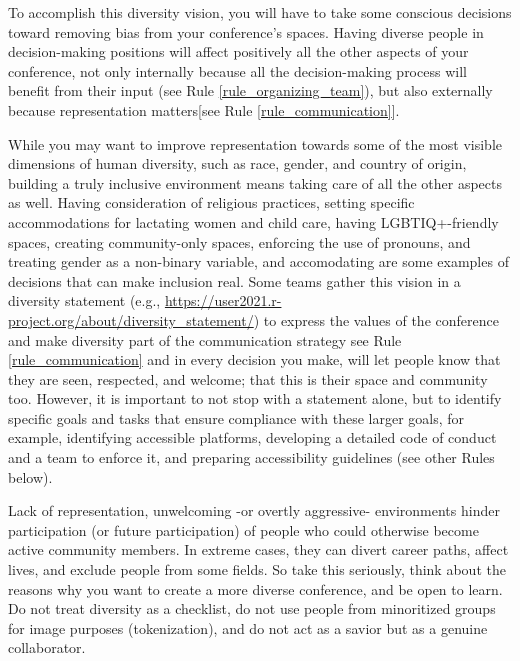 \documentclass[10pt,letterpaper]{article}
\begin{document}
To accomplish this diversity vision, you will have to take some conscious decisions toward removing bias from your conference's spaces. Having diverse people in decision-making positions will affect positively all the other aspects of your conference, not only internally because all the decision-making process will benefit from their input (see Rule \ref{rule_organizing_team}), but also externally because representation matters[see Rule \ref{rule_communication}].

While you may want to improve representation towards some of the most visible dimensions of human diversity, such as race, gender, and country of origin, building a truly inclusive environment means taking care of all the other aspects as well. Having consideration of religious practices, setting specific accommodations for lactating women and child care, having LGBTIQ+-friendly spaces, creating community-only spaces, enforcing the use of pronouns, and treating gender as a non-binary variable, and accomodating are some examples of decisions that can make inclusion real. 
Some teams gather this vision in a diversity statement (e.g., \url{https://user2021.r-project.org/about/diversity_statement/}) to express the values of the conference and make diversity part of the communication strategy see Rule \ref{rule_communication} and in every decision you make, will let people know that they are seen, respected, and welcome; that this is their space and community too. 
However, it is important to not stop with a statement alone, but to identify specific goals and tasks that ensure compliance with these larger goals, for example, identifying accessible platforms, developing a detailed code of conduct and a team to enforce it, and preparing accessibility guidelines (see other Rules below).

Lack of representation, unwelcoming -or overtly aggressive- environments hinder participation (or future participation) of people who could otherwise become active community members. In extreme cases, they can divert career paths, affect lives, and exclude people from some fields. So take this seriously, think about the reasons why you want to create a more diverse conference, and be open to learn. Do not treat diversity as a checklist, do not use people from minoritized groups for image purposes (tokenization), and do not act as a savior but as a genuine collaborator. %
\end{document}
